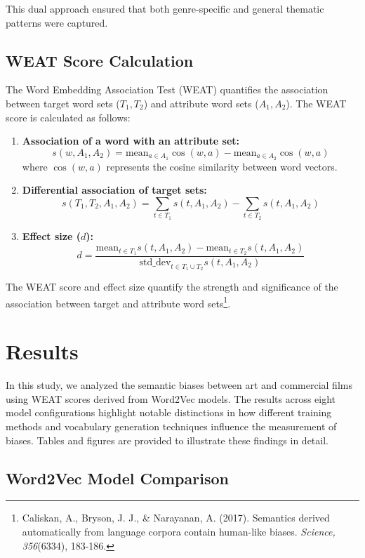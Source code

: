 \documentclass[conference]{IEEEtran}
\begin{document}
This dual approach ensured that both genre-specific and general thematic patterns were captured.

\subsection{WEAT Score Calculation}
The Word Embedding Association Test (WEAT) quantifies the association between target word sets (\(T_1, T_2\)) and attribute word sets (\(A_1, A_2\)). The WEAT score is calculated as follows:

\begin{enumerate}
    \item \textbf{Association of a word with an attribute set:}
    \[
    s(w, A_1, A_2) = \text{mean}_{a \in A_1} \cos(w, a) - \text{mean}_{a \in A_2} \cos(w, a)
    \]
    where \( \cos(w, a) \) represents the cosine similarity between word vectors.

    \item \textbf{Differential association of target sets:}
    \[
    s(T_1, T_2, A_1, A_2) = \sum_{t \in T_1} s(t, A_1, A_2) - \sum_{t \in T_2} s(t, A_1, A_2)
    \]

    \item \textbf{Effect size (\(d\)):}
    \[
    d = \frac{\text{mean}_{t \in T_1} s(t, A_1, A_2) - \text{mean}_{t \in T_2} s(t, A_1, A_2)}{\text{std\_dev}_{t \in T_1 \cup T_2} s(t, A_1, A_2)}
    \]
\end{enumerate}

The WEAT score and effect size quantify the strength and significance of the association between target and attribute word sets\footnote{Caliskan, A., Bryson, J. J., \& Narayanan, A. (2017). Semantics derived automatically from language corpora contain human-like biases. \textit{Science, 356}(6334), 183-186.}.

\section{Results}

In this study, we analyzed the semantic biases between art and commercial films using WEAT scores derived from Word2Vec models. The results across eight model configurations highlight notable distinctions in how different training methods and vocabulary generation techniques influence the measurement of biases. Tables and figures are provided to illustrate these findings in detail.

\subsection{Word2Vec Model Comparison}
\end{document}
